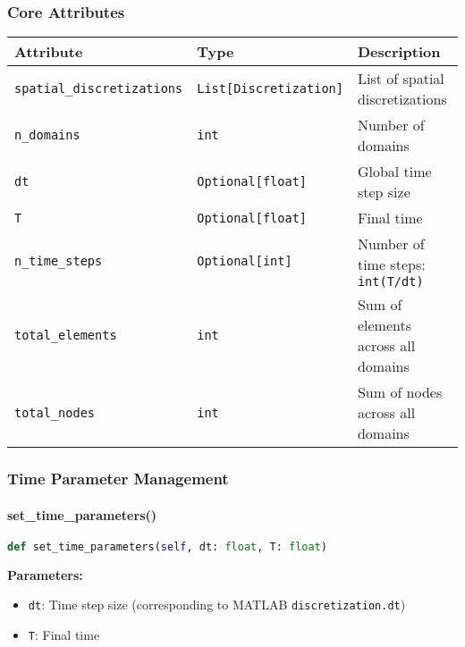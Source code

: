 \subsubsection{Core Attributes}

\begin{longtable}{|p{3.5cm}|p{2.5cm}|p{7cm}|}
\hline
\textbf{Attribute} & \textbf{Type} & \textbf{Description} \\
\hline
\endhead

\texttt{spatial\_discretizations} & \texttt{List[Discretization]} & List of spatial discretizations \\
\hline

\texttt{n\_domains} & \texttt{int} & Number of domains \\
\hline

\texttt{dt} & \texttt{Optional[float]} & Global time step size \\
\hline

\texttt{T} & \texttt{Optional[float]} & Final time \\
\hline

\texttt{n\_time\_steps} & \texttt{Optional[int]} & Number of time steps: \texttt{int(T/dt)} \\
\hline

\texttt{total\_elements} & \texttt{int} & Sum of elements across all domains \\
\hline

\texttt{total\_nodes} & \texttt{int} & Sum of nodes across all domains \\
\hline

\end{longtable}

\subsubsection{Time Parameter Management}

\paragraph{set\_time\_parameters()}
\begin{lstlisting}[language=Python, caption=Set Time Parameters Method]
def set_time_parameters(self, dt: float, T: float)
\end{lstlisting}

\textbf{Parameters:}
\begin{itemize}
    \item \texttt{dt}: Time step size (corresponding to MATLAB \texttt{discretization.dt})
    \item \texttt{T}: Final time
\end{itemize}

